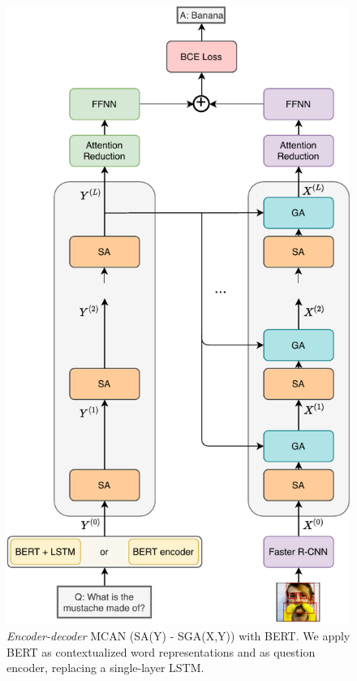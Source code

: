 \documentclass{article}
\begin{document}
\begin{figure}[ht]
	\centering
	\includegraphics[scale=0.7]{enc-dec_mcan_bert}
	\caption{\textit{Encoder-decoder} MCAN (SA(Y) - SGA(X,Y)) with BERT. We apply BERT as contextualized word representations and as question encoder, replacing a single-layer LSTM.}
	\label{fig:mcan_bert}
\end{figure}
\end{document}
